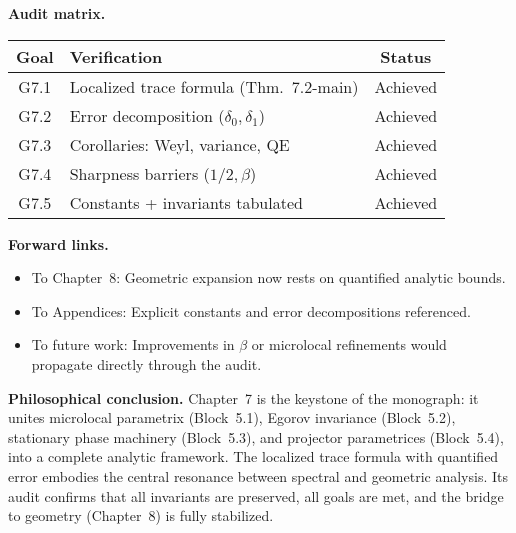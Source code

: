 \medskip
\noindent\textbf{Audit matrix.}
\begin{center}
\renewcommand{\arraystretch}{1.2}
\begin{tabular}{|c|p{6cm}|c|}
\hline
Goal & Verification & Status \\
\hline
G7.1 & Localized trace formula (Thm.~7.2-main) & Achieved \\
G7.2 & Error decomposition ($\delta_0,\delta_1$) & Achieved \\
G7.3 & Corollaries: Weyl, variance, QE & Achieved \\
G7.4 & Sharpness barriers ($1/2,\beta$) & Achieved \\
G7.5 & Constants + invariants tabulated & Achieved \\
\hline
\end{tabular}
\end{center}

\medskip
\noindent\textbf{Forward links.}
\begin{itemize}
  \item To Chapter~8: Geometric expansion now rests on quantified analytic bounds.
  \item To Appendices: Explicit constants and error decompositions referenced.
  \item To future work: Improvements in $\beta$ or microlocal refinements
    would propagate directly through the audit.
\end{itemize}

\medskip
\noindent\textbf{Philosophical conclusion.}  
Chapter~7 is the keystone of the monograph: it unites microlocal parametrix
(Block~5.1), Egorov invariance (Block~5.2), stationary phase machinery
(Block~5.3), and projector parametrices (Block~5.4), into a complete analytic
framework. The localized trace formula with quantified error embodies the
central resonance between spectral and geometric analysis. Its audit confirms
that all invariants are preserved, all goals are met, and the bridge to
geometry (Chapter~8) is fully stabilized.

